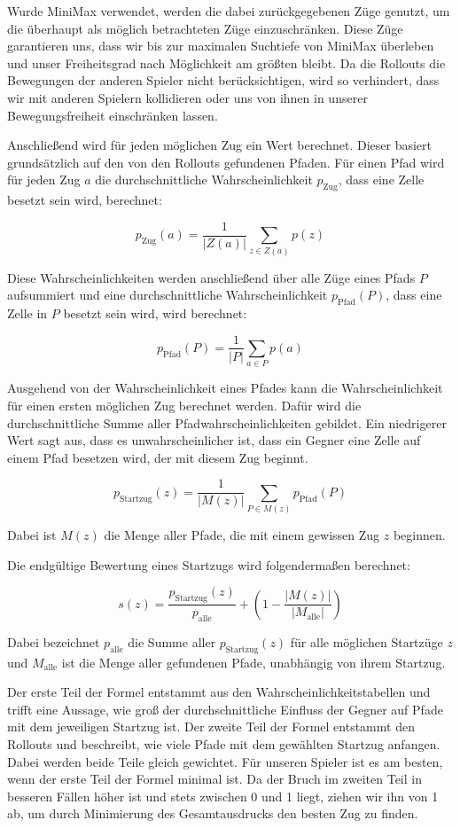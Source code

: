\documentclass[12pt,a4paper]{article}
\begin{document}
Wurde MiniMax verwendet, werden die dabei zurückgegebenen Züge genutzt, um die überhaupt als möglich betrachteten Züge einzuschränken. Diese Züge garantieren uns, dass wir bis zur maximalen Suchtiefe von MiniMax überleben und unser Freiheitsgrad nach Möglichkeit am größten bleibt. Da die Rollouts die Bewegungen der anderen Spieler nicht berücksichtigen, wird so verhindert, dass wir mit anderen Spielern kollidieren oder uns von ihnen in unserer Bewegungsfreiheit einschränken lassen.

Anschließend wird für jeden möglichen Zug ein Wert berechnet. Dieser basiert grund\-sätz\-lich auf den von den Rollouts gefundenen Pfaden. Für einen Pfad wird für jeden Zug $a$ die durchschnittliche Wahrscheinlichkeit $p_{\mathrm{Zug}}$, dass eine Zelle besetzt sein wird, berechnet:

\[ p_{\mathrm{Zug}}(a) = \frac{1}{|Z(a)|} \sum_{z \in Z(a)} p(z) \]

Diese Wahrscheinlichkeiten werden anschließend über alle Züge eines Pfads $P$ aufsummiert und eine durchschnittliche Wahrscheinlichkeit $p_{\textrm{Pfad}}(P)$, dass eine Zelle in $P$ besetzt sein wird, wird berechnet:

$$p_{\mathrm{Pfad}}(P) =  \frac{1}{|P|} \sum_{a \in P} p(a)$$

Ausgehend von der Wahrscheinlichkeit eines Pfades kann die Wahrscheinlichkeit für einen ersten möglichen Zug berechnet werden. Dafür wird die durchschnittliche Summe aller Pfadwahrscheinlichkeiten gebildet. Ein niedrigerer Wert sagt aus, dass es unwahrscheinlicher ist, dass ein Gegner eine Zelle auf einem Pfad besetzen wird, der mit diesem Zug beginnt.

$$p_{\mathrm{Startzug}}(z) = \frac{1}{|M(z)|} \sum_{P \in M(z)} p_{\mathrm{Pfad}}(P)$$

Dabei ist $M(z)$ die Menge aller Pfade, die mit einem gewissen Zug $z$ beginnen.

Die endgültige Bewertung eines Startzugs wird folgendermaßen berechnet:

$$s(z) = \frac{p_{\mathrm{Startzug}}(z)}{p_{\mathrm{alle}}} + \left( 1-\frac{|M(z)|}{|M_{\mathrm{alle}}|} \right)$$

Dabei bezeichnet $p_{\mathrm{alle}}$ die Summe aller $p_{\mathrm{Startzug}}(z)$ für alle möglichen Startzüge $z$ und $M_{\mathrm{alle}}$ ist die Menge aller gefundenen Pfade, unabhängig von ihrem Startzug.

Der erste Teil der Formel entstammt aus den Wahrscheinlichkeitstabellen und trifft eine Aussage, wie groß der durchschnittliche Einfluss der Gegner auf Pfade mit dem jeweiligen Startzug ist. Der zweite Teil der Formel entstammt den Rollouts und beschreibt, wie viele Pfade mit dem gewählten Startzug anfangen. Dabei werden beide Teile gleich gewichtet. Für unseren Spieler ist es am besten, wenn der erste Teil der Formel minimal ist. Da der Bruch im zweiten Teil in besseren Fällen höher ist und stets zwischen 0 und 1 liegt, ziehen wir ihn von 1 ab, um durch Minimierung des Gesamtausdrucks den besten Zug zu finden.
\end{document}
